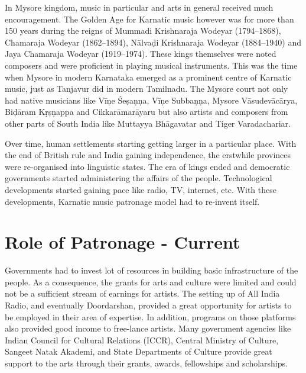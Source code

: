 In Mysore kingdom, music in particular and arts in general received much encouragement. The Golden Age for Karnatic music however was for more than 150 years during the reigns of Mummadi Krishnaraja Wodeyar (1794–1868), Chamaraja Wodeyar (1862–1894), Nālvaḍi Krishnaraja Wodeyar (1884–1940) and Jaya Chamaraja Wodeyar (1919–1974). These kings themselves were noted composers and were proficient in playing musical instruments. This was the time when Mysore in modern Karnataka emerged as a prominent centre of Karnatic music, just as Tanjavur did in modern Tamilnadu. The Mysore court not only had native musicians like Vīṇe Śeṣaṇṇa, Vīṇe Subbaṇṇa, Mysore Vāsudevācārya, Biḍāram Kṛṣṇappa and Cikkarāmarāyaru but also artists and composers from other parts of South India like Muttayya Bhāgavatar and Tiger Varadachariar.

Over time, human settlements starting getting larger in a particular place. With the end of British rule and India gaining independence, the erstwhile provinces were re-organised into linguistic states. The era of kings ended and democratic governments started administering the affairs of the people. Technological developments started gaining pace like radio, TV, internet, etc. With these developments, Karnatic music patronage model had to re-invent itself.

\vspace{-.4cm}

\section*{Role of Patronage - Current}

\vspace{-.2cm}

Governments had to invest lot of resources in building basic infrastructure of the people. As a consequence, the grants for arts and culture were limited and could not be a sufficient stream of earnings for artists. The setting up of All India Radio, and eventually Doordarshan, provided a great opportunity for artists to be employed in their area of expertise. In addition, programs on those platforms also provided good income to free-lance artists. Many government agencies like Indian Council for Cultural Relations (ICCR), Central Ministry of Culture, Sangeet Natak Akademi, and State Departments of Culture provide great support to the arts through their grants, awards, fellowships and scholarships.

